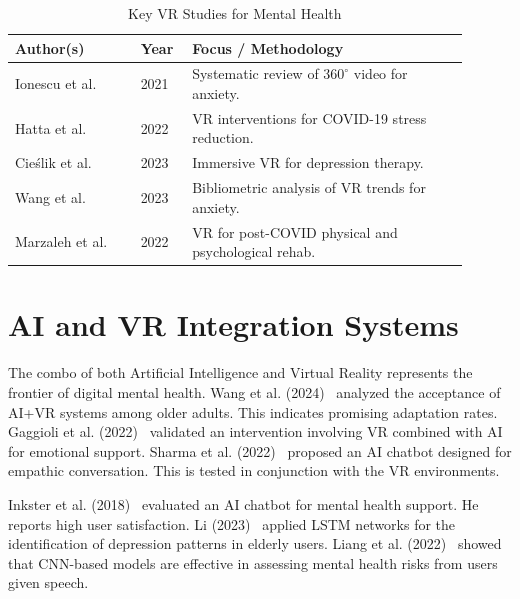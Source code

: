 \begin{table}[H]
\centering
\small
\renewcommand{\arraystretch}{1.3}
\caption{Key VR Studies for Mental Health}
\label{tab:vr}
\begin{tabular}{|p{0.25\linewidth}|p{0.1\linewidth}|p{0.55\linewidth}|}
\hline
\rowcolor{gray!15} \textbf{Author(s)} & \textbf{Year} & \textbf{Focus / Methodology} \\ \hline
Ionescu et al. & 2021 & Systematic review of $360^{\circ}$ video for anxiety. \\ \hline
Hatta et al. & 2022 & VR interventions for COVID-19 stress reduction. \\ \hline
Cieślik et al. & 2023 & Immersive VR for depression therapy. \\ \hline
Wang et al. & 2023 & Bibliometric analysis of VR trends for anxiety. \\ \hline
Marzaleh et al. & 2022 & VR for post-COVID physical and psychological rehab. \\ \hline
\end{tabular}
\end{table}

\section{AI and VR Integration Systems}
The combo of both Artificial Intelligence and Virtual Reality represents the frontier of digital mental health. Wang et al. (2024)~\cite{wang2024aging} analyzed the acceptance of AI+VR systems among older adults. This indicates promising adaptation rates. Gaggioli et al. (2022)~\cite{gaggioli2022emotional} validated an intervention involving VR combined with AI for emotional support. Sharma et al. (2022)~\cite{sharma2022empathetic} proposed an AI chatbot designed for empathic conversation. This is tested in conjunction with the VR environments.

Inkster et al. (2018)~\cite{inkster2018ai} evaluated an AI chatbot for mental health support. He reports high user satisfaction. Li (2023)~\cite{li2023lstm} applied LSTM networks for the identification of depression patterns in elderly users. Liang et al. (2022)~\cite{liang2022cnn} showed that CNN-based models are effective in assessing mental health risks from users given speech.

